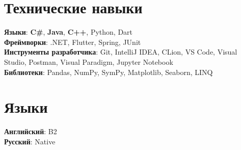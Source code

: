 \documentclass[letterpaper,11pt]{article}
\begin{document}

%
\section{Технические навыки}
 \begin{itemize}[leftmargin=0.15in, label={}]
    \small{\item{
     \textbf{Языки}{: \textbf{C\#}, \textbf{Java}, \textbf{C++}, Python, Dart} \\
     \textbf{Фреймворки}{: .NET, Flutter, Spring, JUnit} \\
     \textbf{Инструменты разработчика}{: Git, IntelliJ IDEA, CLion, VS Code, Visual Studio, Postman, Visual Paradigm, Jupyter Notebook} \\
     \textbf{Библиотеки}{: Pandas, NumPy, SymPy, Matplotlib, Seaborn, LINQ}
    }}
 \end{itemize}

\section{Языки}
 \begin{itemize}[leftmargin=0.15in, label={}]
    \small{\item{
     \textbf{Английский}{: B2} \\
     \textbf{Русский}{: Native}
    }}
 \end{itemize}

\end{document}
